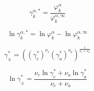 \documentclass[12pt, letterpaper]{article}
\begin{document}

\begin{equation}
    \gamma_{k}^{\alpha,*}
    =
    \frac{\varphi_{k}^{\alpha}}{\varphi_{k}^{\alpha,\infty}}
    \label{eq:gamma_alpha_asym}
\end{equation}


\begin{equation}
    \ln\gamma_{k}^{\alpha,*}
    =
    \ln\varphi_{k}^{\alpha}
    -
    \ln\varphi_{k}^{\alpha,\infty}
    \label{eq:lngamma_alpha_asym}
\end{equation}


\begin{equation}
    \gamma_{\pm}^{*}
    =
    \left(
    \left(\gamma_{c}^{*}\right)^{\nu_{c}}
    \left(\gamma_{a}^{*}\right)^{\nu_{a}}
    \right)^{\frac{1}{\nu_{c}+\nu_{a}}}
    \label{eq:gamma_pm_asym}
\end{equation}


\begin{equation}
    \ln\gamma_{\pm}^{*}
    =
    \frac{\nu_{c}\ln\gamma_{c}^{*}+\nu_{a}\ln\gamma_{a}^{*}}{\nu_{c}+\nu_{a}}
    \label{eq:lngamma_pm_asym}
\end{equation}
\end{document}
